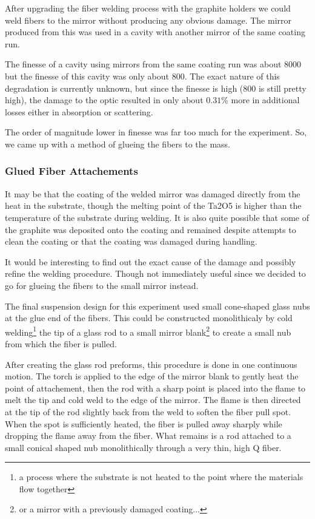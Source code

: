 After upgrading the fiber welding process with the graphite holders we could
weld fibers to the mirror without producing any obvious damage.
The mirror produced from this was used in a cavity with another mirror of the
same coating run.

The finesse of a cavity using mirrors from the same coating run was about 8000
but the finesse of this cavity was only about 800.
The exact nature of this degradation is currently unknown, but since the
finesse is high (800 is still pretty high), the damage to the optic resulted
in only about $0.31\%$ more in additional losses either in absorption or 
scattering.


The order of magnitude lower in finesse was far too much for the
experiment.
So, we came up with a method of glueing the fibers to the mass.

\subsubsection{Glued Fiber Attachements}

It may be that the coating of the welded mirror was damaged directly from the
heat in the substrate,
though the melting point of the Ta2O5 is higher than the temperature of the
substrate during welding. 
It is also quite possible that some of the graphite was deposited onto the
coating and remained despite attempts to clean the coating or that the coating
was damaged during handling.

It would be interesting to find out the exact cause of the damage and possibly
refine the welding procedure.
Though not immediately useful since we decided to go for glueing the fibers to
the small mirror instead.

The final suspension design for this experiment used small cone-shaped glass
nubs at the glue end of the fibers.
This could be constructed monolithicaly
by cold welding\footnote{a process where the substrate is not heated to the
point where the materials flow together} the tip of a glass rod to a small
mirror blank\footnote{or a mirror with a previously damaged coating...} to
create a small nub from which the fiber is pulled.

After creating the glass rod preforms, this procedure is done in one
continuous motion.
The torch is applied to the edge of the mirror blank to
gently heat the point of attachement, then the rod with a sharp point is
placed into the flame to melt the tip and cold weld to the edge of the mirror.
The flame is then directed at the tip of the rod slightly back from the weld
to soften the fiber pull spot.
When the spot is sufficiently heated, the fiber
is pulled away sharply while dropping the flame away from the fiber.
What
remains is a rod attached to a small conical shaped nub monolithically through
a very thin, high Q fiber.

